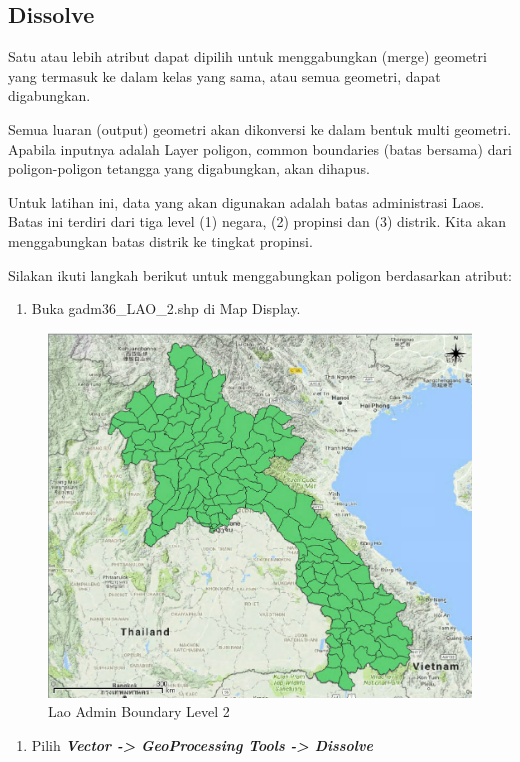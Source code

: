 \documentclass[]{book}
\providecommand{\tightlist}{%
  \setlength{\itemsep}{0pt}\setlength{\parskip}{0pt}}
\begin{document}
\hypertarget{dissolve}{%
\subsection{Dissolve}\label{dissolve}}

Satu atau lebih atribut dapat dipilih untuk menggabungkan (merge) geometri yang termasuk ke dalam kelas yang sama, atau semua geometri, dapat digabungkan.

Semua luaran (output) geometri akan dikonversi ke dalam bentuk multi geometri. Apabila inputnya adalah Layer poligon, common boundaries (batas bersama) dari poligon-poligon tetangga yang digabungkan, akan dihapus.

Untuk latihan ini, data yang akan digunakan adalah batas administrasi Laos. Batas ini terdiri dari tiga level (1) negara, (2) propinsi dan (3) distrik. Kita akan menggabungkan batas distrik ke tingkat propinsi.

Silakan ikuti langkah berikut untuk menggabungkan poligon berdasarkan atribut:

\begin{enumerate}
\def\labelenumi{\arabic{enumi}.}
\tightlist
\item
  Buka gadm36\_LAO\_2.shp di Map Display.
\end{enumerate}

\begin{figure}

{\centering \includegraphics[width=0.7\linewidth]{images/04/fig19} 

}

\caption{Lao Admin Boundary Level 2}\label{fig:fig1419}
\end{figure}

\begin{enumerate}
\def\labelenumi{\arabic{enumi}.}
\setcounter{enumi}{1}
\tightlist
\item
  Pilih \textbf{\emph{Vector -\textgreater{} GeoProcessing Tools -\textgreater{} Dissolve}}
\end{enumerate}
\end{document}
